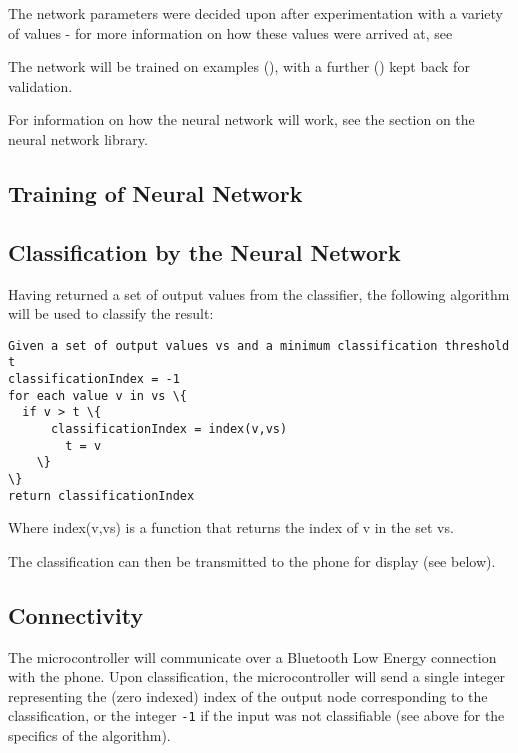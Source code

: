 \documentclass[a4paper]{article}
\begin{document}

The network parameters were decided upon after experimentation with a variety of values - for more information on how these values were arrived at, see 

The network will be trained on  examples (), with a further  () kept back for validation.

For information on how the neural network will work, see the section on the neural network library. 

\subsection{Training of Neural Network}%


\subsection{Classification by the Neural Network}%

Having returned a set of output values from the classifier, the following algorithm will be used to classify the result:

\begin{lstlisting}
Given a set of output values vs and a minimum classification threshold t
classificationIndex = -1
for each value v in vs \{
  if v > t \{
      classificationIndex = index(v,vs)
        t = v
    \}
\}
return classificationIndex
\end{lstlisting}

Where index(v,vs) is a function that returns the index of v in the set vs.


The classification can then be transmitted to the phone for display (see below).

\subsection{Connectivity}%

The microcontroller will communicate over a Bluetooth Low Energy connection with the phone. Upon classification, the microcontroller will send a single integer representing the (zero indexed) index of the output node corresponding to the classification, or the integer \lstinline{-1} if the input was not classifiable (see above for the specifics of the algorithm).
\end{document}
